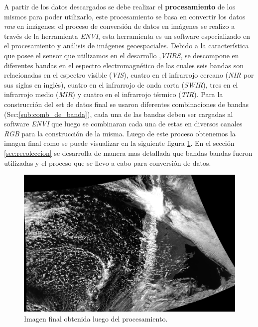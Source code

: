 %
A partir de los datos descargados  se debe realizar el \textbf{procesamiento} de los mismos para poder utilizarlo, este procesamiento se basa en convertir los datos \textit{raw} en imágenes; el proceso de conversión de datos en imágenes se realizo a través de la herramienta \textit{ENVI}, esta herramienta es un software  especializado en el procesamiento y análisis de imágenes  geoespaciales. Debido a la característica que posee el sensor que utilizamos en el desarrollo ,\textit{VIIRS}, se descompone en diferentes bandas en el espectro electromagnético de las cuales seis bandas son relacionadas en el espectro visible (\textit{VIS}), cuatro en el infrarrojo cercano (\textit{NIR} por sus siglas en inglés), cuatro en el infrarrojo de onda corta (\textit{SWIR}), tres en el infrarrojo medio (\textit{MIR}) y cuatro en el infrarrojo térmico (\textit{TIR}). Para la construcción del set de datos final se usaron diferentes combinaciones de bandas (Sec:\ref{sub:comb_de_banda}), cada una de las bandas deben ser cargadas al software \textit{ENVI} que luego se combinaran cada una de estas en diversos canales \textit{RGB} para la construcción de la misma. Luego de este proceso obtenemos la imagen final como se puede visualizar en la siguiente figura \ref{Fig:img-final}. En el sección \ref{sec:recoleccion} se desarrolla de manera mas detallada que bandas bandas fueron utilizadas y el proceso que se llevo a cabo para conversión de datos.

\begin{figure}[H] \centering
  \includegraphics[scale=0.4,keepaspectratio=true,clip=true]{imagenes/tbd/pre-img.png}
  \caption{Imagen final obtenida luego del procesamiento.}\label{Fig:img-final}
\end{figure}



